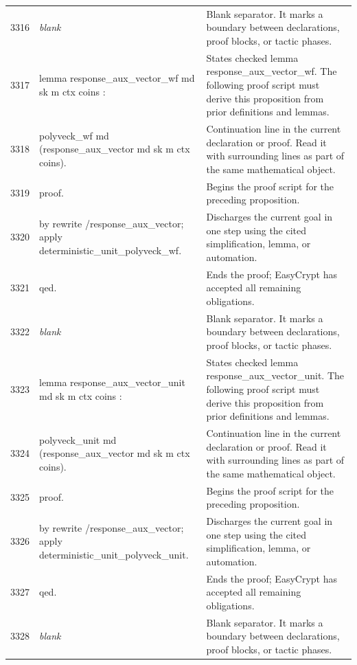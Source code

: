 \documentclass[10pt]{article}
\begin{document}
\begin{longtable}{r L{0.53\textwidth} L{0.37\textwidth}}
3316 & {\ttfamily\scriptsize \emph{blank}} & Blank separator.  It marks a boundary between declarations, proof blocks, or tactic phases. \\
3317 & {\ttfamily\scriptsize lemma response\_aux\_vector\_wf md sk m ctx coins :} & States checked lemma response\_aux\_vector\_wf.  The following proof script must derive this proposition from prior definitions and lemmas. \\
3318 & {\ttfamily\scriptsize   polyveck\_wf md (response\_aux\_vector md sk m ctx coins).} & Continuation line in the current declaration or proof.  Read it with surrounding lines as part of the same mathematical object. \\
3319 & {\ttfamily\scriptsize proof.} & Begins the proof script for the preceding proposition. \\
3320 & {\ttfamily\scriptsize by rewrite /response\_aux\_vector; apply deterministic\_unit\_polyveck\_wf.} & Discharges the current goal in one step using the cited simplification, lemma, or automation. \\
3321 & {\ttfamily\scriptsize qed.} & Ends the proof; EasyCrypt has accepted all remaining obligations. \\
3322 & {\ttfamily\scriptsize \emph{blank}} & Blank separator.  It marks a boundary between declarations, proof blocks, or tactic phases. \\
3323 & {\ttfamily\scriptsize lemma response\_aux\_vector\_unit md sk m ctx coins :} & States checked lemma response\_aux\_vector\_unit.  The following proof script must derive this proposition from prior definitions and lemmas. \\
3324 & {\ttfamily\scriptsize   polyveck\_unit md (response\_aux\_vector md sk m ctx coins).} & Continuation line in the current declaration or proof.  Read it with surrounding lines as part of the same mathematical object. \\
3325 & {\ttfamily\scriptsize proof.} & Begins the proof script for the preceding proposition. \\
3326 & {\ttfamily\scriptsize by rewrite /response\_aux\_vector; apply deterministic\_unit\_polyveck\_unit.} & Discharges the current goal in one step using the cited simplification, lemma, or automation. \\
3327 & {\ttfamily\scriptsize qed.} & Ends the proof; EasyCrypt has accepted all remaining obligations. \\
3328 & {\ttfamily\scriptsize \emph{blank}} & Blank separator.  It marks a boundary between declarations, proof blocks, or tactic phases. \\

\end{longtable}
\end{document}
